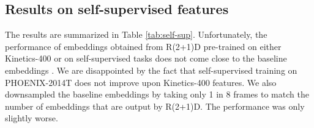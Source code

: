 \documentclass[final]{cvpr}
\begin{document}

\subsection{Results on self-supervised features}
The results are summarized in Table \ref{tab:self-sup}. Unfortunately, the performance of embeddings obtained from R(2+1)D pre-trained on either Kinetics-400 or on self-supervised tasks does not come close to the baseline embeddings \cite{hmm}. We are disappointed by the fact that self-supervised training on PHOENIX-2014T does not improve upon Kinetics-400 features. We also downsampled the baseline embeddings by taking only 1 in 8 frames to match the number of embeddings that are output by R(2+1)D. The performance was only slightly worse.
\end{document}
